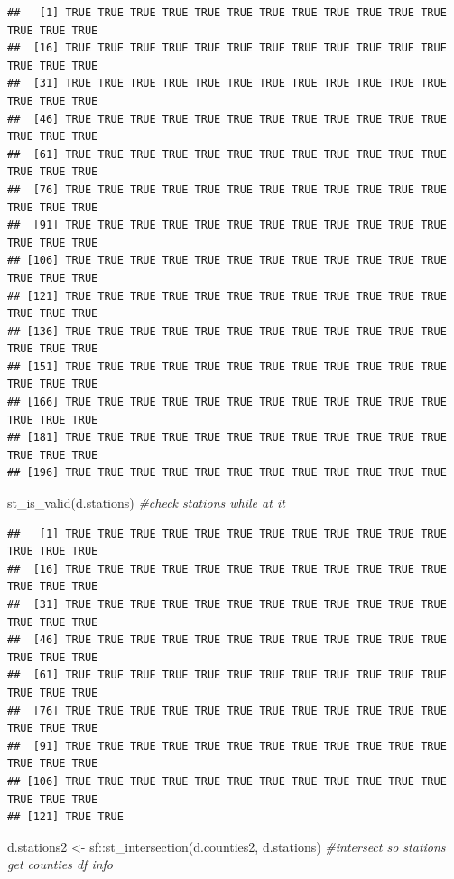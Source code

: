 \documentclass[
]{article}
\newenvironment{Shaded}{\begin{snugshade}}{\end{snugshade}}
\newcommand{\CommentTok}[1]{\textcolor[rgb]{0.56,0.35,0.01}{\textit{#1}}}
\newcommand{\FunctionTok}[1]{\textcolor[rgb]{0.00,0.00,0.00}{#1}}
\newcommand{\NormalTok}[1]{#1}
\newcommand{\OtherTok}[1]{\textcolor[rgb]{0.56,0.35,0.01}{#1}}
\newcommand{\SpecialCharTok}[1]{\textcolor[rgb]{0.00,0.00,0.00}{#1}}
\begin{document}
\begin{verbatim}
##   [1] TRUE TRUE TRUE TRUE TRUE TRUE TRUE TRUE TRUE TRUE TRUE TRUE TRUE TRUE TRUE
##  [16] TRUE TRUE TRUE TRUE TRUE TRUE TRUE TRUE TRUE TRUE TRUE TRUE TRUE TRUE TRUE
##  [31] TRUE TRUE TRUE TRUE TRUE TRUE TRUE TRUE TRUE TRUE TRUE TRUE TRUE TRUE TRUE
##  [46] TRUE TRUE TRUE TRUE TRUE TRUE TRUE TRUE TRUE TRUE TRUE TRUE TRUE TRUE TRUE
##  [61] TRUE TRUE TRUE TRUE TRUE TRUE TRUE TRUE TRUE TRUE TRUE TRUE TRUE TRUE TRUE
##  [76] TRUE TRUE TRUE TRUE TRUE TRUE TRUE TRUE TRUE TRUE TRUE TRUE TRUE TRUE TRUE
##  [91] TRUE TRUE TRUE TRUE TRUE TRUE TRUE TRUE TRUE TRUE TRUE TRUE TRUE TRUE TRUE
## [106] TRUE TRUE TRUE TRUE TRUE TRUE TRUE TRUE TRUE TRUE TRUE TRUE TRUE TRUE TRUE
## [121] TRUE TRUE TRUE TRUE TRUE TRUE TRUE TRUE TRUE TRUE TRUE TRUE TRUE TRUE TRUE
## [136] TRUE TRUE TRUE TRUE TRUE TRUE TRUE TRUE TRUE TRUE TRUE TRUE TRUE TRUE TRUE
## [151] TRUE TRUE TRUE TRUE TRUE TRUE TRUE TRUE TRUE TRUE TRUE TRUE TRUE TRUE TRUE
## [166] TRUE TRUE TRUE TRUE TRUE TRUE TRUE TRUE TRUE TRUE TRUE TRUE TRUE TRUE TRUE
## [181] TRUE TRUE TRUE TRUE TRUE TRUE TRUE TRUE TRUE TRUE TRUE TRUE TRUE TRUE TRUE
## [196] TRUE TRUE TRUE TRUE TRUE TRUE TRUE TRUE TRUE TRUE TRUE TRUE
\end{verbatim}

\begin{Shaded}
\begin{Highlighting}[]
\FunctionTok{st\_is\_valid}\NormalTok{(d.stations) }\CommentTok{\#check stations while at it}
\end{Highlighting}
\end{Shaded}

\begin{verbatim}
##   [1] TRUE TRUE TRUE TRUE TRUE TRUE TRUE TRUE TRUE TRUE TRUE TRUE TRUE TRUE TRUE
##  [16] TRUE TRUE TRUE TRUE TRUE TRUE TRUE TRUE TRUE TRUE TRUE TRUE TRUE TRUE TRUE
##  [31] TRUE TRUE TRUE TRUE TRUE TRUE TRUE TRUE TRUE TRUE TRUE TRUE TRUE TRUE TRUE
##  [46] TRUE TRUE TRUE TRUE TRUE TRUE TRUE TRUE TRUE TRUE TRUE TRUE TRUE TRUE TRUE
##  [61] TRUE TRUE TRUE TRUE TRUE TRUE TRUE TRUE TRUE TRUE TRUE TRUE TRUE TRUE TRUE
##  [76] TRUE TRUE TRUE TRUE TRUE TRUE TRUE TRUE TRUE TRUE TRUE TRUE TRUE TRUE TRUE
##  [91] TRUE TRUE TRUE TRUE TRUE TRUE TRUE TRUE TRUE TRUE TRUE TRUE TRUE TRUE TRUE
## [106] TRUE TRUE TRUE TRUE TRUE TRUE TRUE TRUE TRUE TRUE TRUE TRUE TRUE TRUE TRUE
## [121] TRUE TRUE
\end{verbatim}

\begin{Shaded}
\begin{Highlighting}[]
\NormalTok{d.stations2 }\OtherTok{\textless{}{-}}\NormalTok{ sf}\SpecialCharTok{::}\FunctionTok{st\_intersection}\NormalTok{(d.counties2, d.stations) }\CommentTok{\#intersect so stations get counties df info}
\end{Highlighting}
\end{Shaded}
\end{document}
